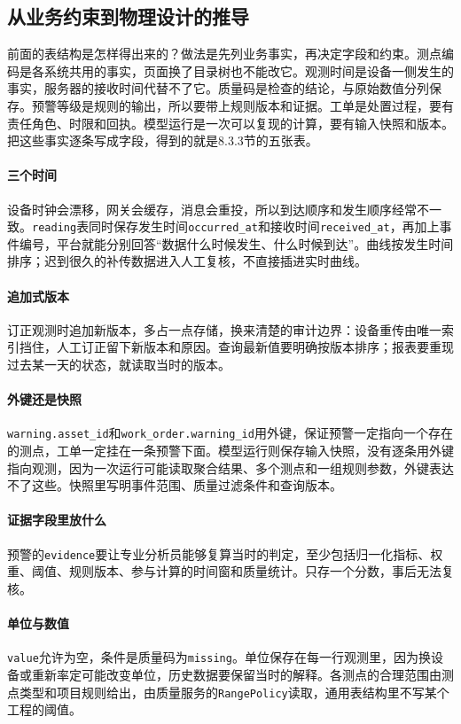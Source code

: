 \subsection{从业务约束到物理设计的推导}

前面的表结构是怎样得出来的？做法是先列业务事实，再决定字段和约束。测点编码是各系统共用的事实，页面换了目录树也不能改它。观测时间是设备一侧发生的事实，服务器的接收时间代替不了它。质量码是检查的结论，与原始数值分列保存。预警等级是规则的输出，所以要带上规则版本和证据。工单是处置过程，要有责任角色、时限和回执。模型运行是一次可以复现的计算，要有输入快照和版本。把这些事实逐条写成字段，得到的就是8.3.3节的五张表。

\paragraph{三个时间}设备时钟会漂移，网关会缓存，消息会重投，所以到达顺序和发生顺序经常不一致。\texttt{reading}表同时保存发生时间\texttt{occurred\_at}和接收时间\texttt{received\_at}，再加上事件编号，平台就能分别回答“数据什么时候发生、什么时候到达”。曲线按发生时间排序；迟到很久的补传数据进入人工复核，不直接插进实时曲线。

\paragraph{追加式版本}订正观测时追加新版本，多占一点存储，换来清楚的审计边界：设备重传由唯一索引挡住，人工订正留下新版本和原因。查询最新值要明确按版本排序；报表要重现过去某一天的状态，就读取当时的版本。

\paragraph{外键还是快照}\texttt{warning.asset\_id}和\texttt{work\_order.warning\_id}用外键，保证预警一定指向一个存在的测点，工单一定挂在一条预警下面。模型运行则保存输入快照，没有逐条用外键指向观测，因为一次运行可能读取聚合结果、多个测点和一组规则参数，外键表达不了这些。快照里写明事件范围、质量过滤条件和查询版本。

\paragraph{证据字段里放什么}预警的\texttt{evidence}要让专业分析员能够复算当时的判定，至少包括归一化指标、权重、阈值、规则版本、参与计算的时间窗和质量统计。只存一个分数，事后无法复核。

\paragraph{单位与数值}\texttt{value}允许为空，条件是质量码为\texttt{missing}。单位保存在每一行观测里，因为换设备或重新率定可能改变单位，历史数据要保留当时的解释。各测点的合理范围由测点类型和项目规则给出，由质量服务的\texttt{RangePolicy}读取，通用表结构里不写某个工程的阈值。

